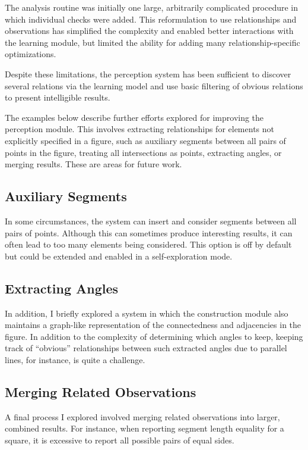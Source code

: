 The analysis routine was initially one large, arbitrarily complicated
procedure in which individual checks were added. This reformulation to
use relationships and observations has simplified the complexity and
enabled better interactions with the learning module, but limited the
ability for adding many relationship-specific optimizations.

Despite these limitations, the perception system has been sufficient
to discover several relations via the learning model and use basic
filtering of obvious relations to present intelligible results.

The examples below describe further efforts explored for improving the
perception module. This involves extracting relationships for elements
not explicitly specified in a figure, such as auxiliary segments
between all pairs of points in the figure, treating all intersections
as points, extracting angles, or merging results. These are areas for
future work.

\subsection{Auxiliary Segments}

In some circumstances, the system can insert and consider segments
between all pairs of points. Although this can sometimes produce
interesting results, it can often lead to too many elements being
considered. This option is off by default but could be extended and
enabled in a self-exploration mode.

\subsection{Extracting Angles}

In addition, I briefly explored a system in which the construction
module also maintains a graph-like representation of the connectedness
and adjacencies in the figure. In addition to the complexity of
determining which angles to keep, keeping track of ``obvious''
relationships between such extracted angles due to parallel lines, for
instance, is quite a challenge.

\subsection{Merging Related Observations}

A final process I explored involved merging related observations into
larger, combined results. For instance, when reporting segment length
equality for a square, it is excessive to report all possible pairs of
equal sides.

